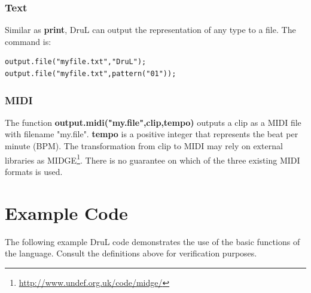 \documentclass[11pt,twoside]{article}
\begin{document}
\subsubsection{Text}

Similar as \textbf{print}, DruL can output the representation of any type 
to a file. The command is:
\begin{verbatim}
output.file("myfile.txt","DruL");
output.file("myfile.txt",pattern("01"));
\end{verbatim}

\subsubsection{MIDI}

The function \textbf{output.midi("my.file",clip,tempo)} outputs a clip as a MIDI
file with filename "my.file". \textbf{tempo} is a positive integer that
represents the beat per minute (BPM). 
The transformation from clip to MIDI may rely
on external libraries as MIDGE\footnote{\url{http://www.undef.org.uk/code/midge/}}. There is no guarantee on which of the three existing MIDI formats is used.





\clearpage

\section{Example Code}

The following example DruL code demonstrates the use of the basic functions of the language.
Consult the definitions above for verification purposes.
\end{document}
